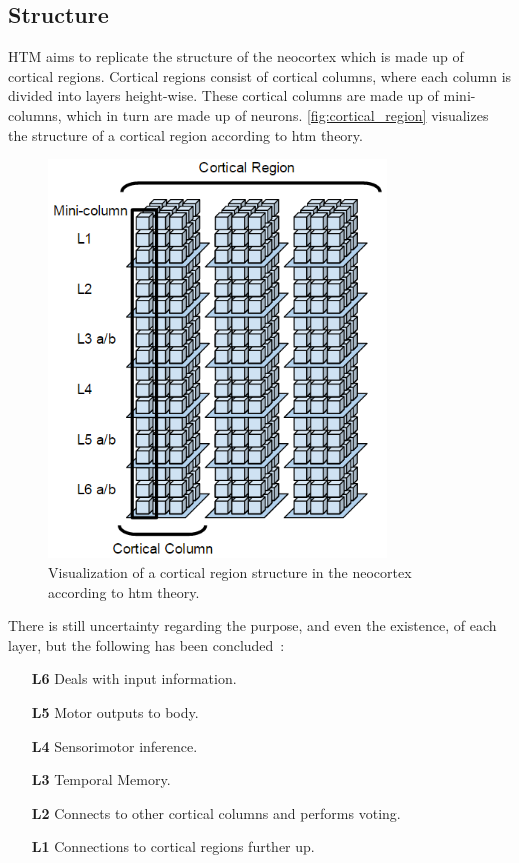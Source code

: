 \subsection{Structure}
\label{sec:htm_structure}
HTM aims to replicate the structure of the neocortex which is made up of cortical regions. Cortical regions consist of cortical columns, where each column is divided into layers height-wise. These cortical columns are made up of mini-columns, which in turn are made up of neurons. \autoref{fig:cortical_region} visualizes the structure of a cortical region according to \gls*{htm} theory.
\begin{figure}[htb]
    \centering
    \includegraphics[width=0.8\textwidth]{resources/related_works/cortical_region}
    \caption[HTM Structure]{Visualization of a cortical region structure in the neocortex according to \gls*{htm} theory.}
    \label{fig:cortical_region}
\end{figure}
\par
There is still uncertainty regarding the purpose, and even the existence, of each layer, but the following has been concluded~\cite{htm_l2_l3,cortical_region}:
\begin{itemize}
    \item[\textbf{L6}] Deals with input information.
    \item[\textbf{L5}] Motor outputs to body.
    \item[\textbf{L4}] Sensorimotor inference.
    \item[\textbf{L3}] Temporal Memory.
    \item[\textbf{L2}] Connects to other cortical columns and performs voting.
    \item[\textbf{L1}] Connections to cortical regions further up.
\end{itemize}
